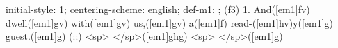 initial-style: 1;
centering-scheme: english;
def-m1: \grealign;
(f3) 1. And([em1]fv) dwell([em1]gv) with([em1]gv) us,([em1]gv) a([em1]f) read-([em1]hv)y([em1]g) guest.([em1]g) (::) <sp> </sp>([em1]ghg) <sp> </sp>([em1]g)